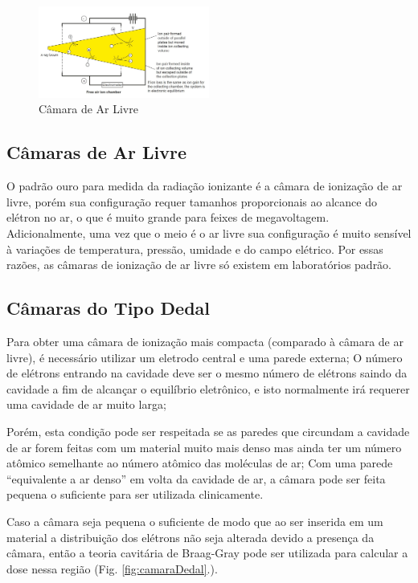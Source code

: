 \documentclass[11pt,a4paper]{article}
\begin{document}
		\begin{figure}[h]
			\centering
			\includegraphics[width=0.5\textwidth]{Imagens/camaraArLivre.jpg}
			\caption{Câmara de Ar Livre}
			\label{fig:camaraArLivre}
		\end{figure}

	\subsection{Câmaras de Ar Livre}
		
		O padrão ouro para medida da radiação ionizante é a câmara de ionização de ar livre, porém sua configuração requer tamanhos proporcionais ao alcance do elétron no ar, o que é muito grande para feixes de megavoltagem. Adicionalmente, uma vez que o meio é o ar livre sua configuração é muito sensível à variações de temperatura, pressão, umidade e do campo elétrico. Por essas razões, as câmaras de ionização de ar livre só existem em laboratórios padrão. 

	\subsection{Câmaras do Tipo Dedal}

		Para obter uma câmara de ionização mais compacta (comparado à câmara de ar livre), é necessário utilizar um eletrodo central e uma parede externa;  O número de elétrons entrando na cavidade deve ser o mesmo número de elétrons saindo da cavidade a fim de alcançar o equilíbrio eletrônico, e isto normalmente irá requerer uma cavidade de ar muito larga;
		
		Porém, esta condição pode ser respeitada se as paredes que circundam a cavidade de ar forem feitas com um material muito mais denso mas ainda ter um número atômico semelhante ao número atômico das moléculas de ar; Com uma parede ``equivalente a ar denso'' em volta da cavidade de ar, a câmara pode ser feita pequena o suficiente para ser utilizada clinicamente.

		Caso a câmara seja pequena o suficiente de modo que ao ser inserida em um material a distribuição dos elétrons não seja alterada devido a presença da câmara, então a teoria cavitária de Braag-Gray pode ser utilizada para calcular a dose nessa região (Fig. \ref{fig:camaraDedal}.). 
\end{document}
